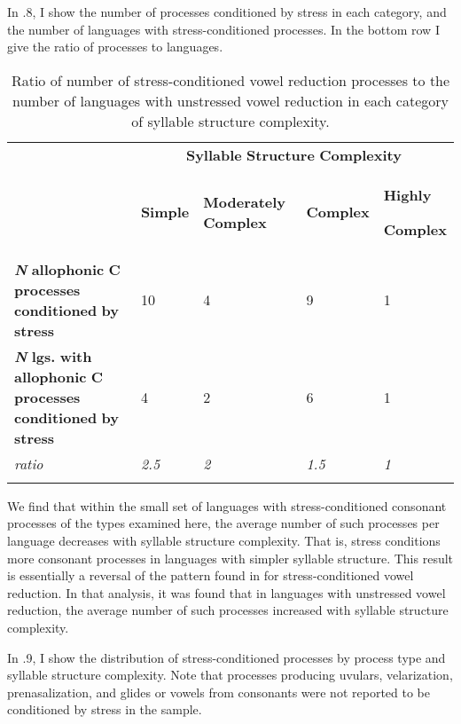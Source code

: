   In .8, I show the number of processes conditioned by stress in each category, and the number of languages with stress-conditioned processes. In the bottom row I give the ratio of processes to languages.

\begin{table}
\begin{tabularx}{\textwidth}{XXXXX}
\lsptoprule
 & \multicolumn{4}{c}{ \textbf{Syllable} \textbf{Structure} \textbf{Complexity}}\\
& \textbf{Simple} & \textbf{Moderately} \textbf{Complex} & \textbf{Complex} & { \textbf{Highly} }

 \textbf{Complex}\\
 \textbf{\textit{N}} \textbf{allophonic} \textbf{C} \textbf{processes} \textbf{conditioned} \textbf{by} \textbf{stress} & 10 & 4 & 9 & 1\\
 \textbf{\textit{N}} \textbf{lgs.} \textbf{with} \textbf{allophonic} \textbf{C} \textbf{processes} \textbf{conditioned} \textbf{by} \textbf{stress} & 4 & 2 & 6 & 1\\
 \textit{ratio} & \textit{2.5} & \textit{2} & \textit{1.5} & \textit{1}\\
\lspbottomrule
\end{tabularx}
\caption{\label{7.8}Ratio of number of stress-conditioned vowel reduction processes to the number of languages with unstressed vowel reduction in each category of syllable structure complexity.}
\end{table}

  We find that within the small set of languages with stress-conditioned consonant processes of the types examined here, the average number of such processes per language decreases with syllable structure complexity. That is, stress conditions more consonant processes in languages with simpler syllable structure. This result is essentially a reversal of the pattern found in  for stress-conditioned vowel reduction. In that analysis, it was found that in languages with unstressed vowel reduction, the average number of such processes increased with syllable structure complexity.

  In .9, I show the distribution of stress-conditioned processes by process type and syllable structure complexity. Note that processes producing uvulars, velarization, prenasalization, and glides or vowels from consonants were not reported to be conditioned by stress in the sample.

